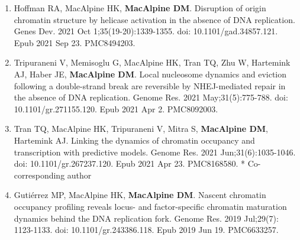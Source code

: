 \begin{statement}
\begin{enumerate}
\item Hoffman RA, MacAlpine HK, \textbf{MacAlpine DM}. Disruption of origin chromatin structure by helicase activation in the absence of DNA replication. Genes Dev. 2021 Oct 1;35(19-20):1339-1355. doi: 10.1101/gad.34857.121. Epub 2021 Sep 23. PMC8494203.

\item Tripuraneni V, Memisoglu G, MacAlpine HK, Tran TQ, Zhu W, Hartemink AJ, Haber JE, \textbf{MacAlpine DM}. Local nucleosome dynamics and eviction following a double-strand break are reversible by NHEJ-mediated repair in the absence of DNA replication. Genome Res. 2021 May;31(5):775-788. doi: 10.1101/gr.271155.120. Epub 2021 Apr 2. PMC8092003.

\item Tran TQ, MacAlpine HK, Tripuraneni V, Mitra S, \textbf{MacAlpine DM}, Hartemink AJ. Linking the dynamics of chromatin occupancy and transcription with predictive models. Genome Res. 2021 Jun;31(6):1035-1046. doi: 10.1101/gr.267237.120. Epub 2021 Apr 23. PMC8168580. * Co-corresponding author

\item Gutiérrez MP, MacAlpine HK, \textbf{MacAlpine DM}. Nascent chromatin occupancy profiling reveals locus- and factor-specific chromatin maturation dynamics behind the DNA replication fork. Genome Res. 2019 Jul;29(7): 1123-1133. doi: 10.1101/gr.243386.118. Epub 2019 Jun 19. PMC6633257.

\end{enumerate}

\end{statement}
